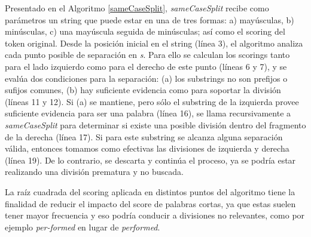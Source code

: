 Presentado en el Algoritmo \ref{sameCaseSplit}, \textit{sameCaseSplit} recibe como parámetros un string que puede estar en una de tres formas: a) mayúsculas, b) minúsculas, c) una mayúscula seguida de minúsculas; así como el scoring del token original.
Desde la posición inicial en el string (línea 3), el algoritmo analiza cada punto posible de separación en \textit{s}.
Para ello se calculan los scorings tanto para el lado izquierdo como para el derecho de este punto (líneas 6 y 7), y se evalúa dos condiciones para la separación: (a) los substrings no son prefijos o sufijos comunes, (b) hay suficiente evidencia como para soportar la división (líneas 11 y 12).
Si (a) se mantiene, pero sólo el substring de la izquierda provee suficiente evidencia para ser una palabra (línea 16), se llama recursivamente a \textit{sameCaseSplit} para determinar si existe una posible división dentro del fragmento de la derecha (línea 17).
Si para este substring se alcanza alguna separación válida, entonces tomamos como efectivas las divisiones de izquierda y derecha (línea 19). De lo contrario, se descarta y continúa el proceso, ya se podría estar realizando una división prematura y no buscada.

La raíz cuadrada del scoring aplicada en distintos puntos del algoritmo tiene la finalidad de reducir el impacto del score de palabras cortas, ya que estas suelen tener mayor frecuencia y eso podría conducir a divisiones no relevantes, como por ejemplo \textit{per-formed} en lugar de \textit{performed}.


